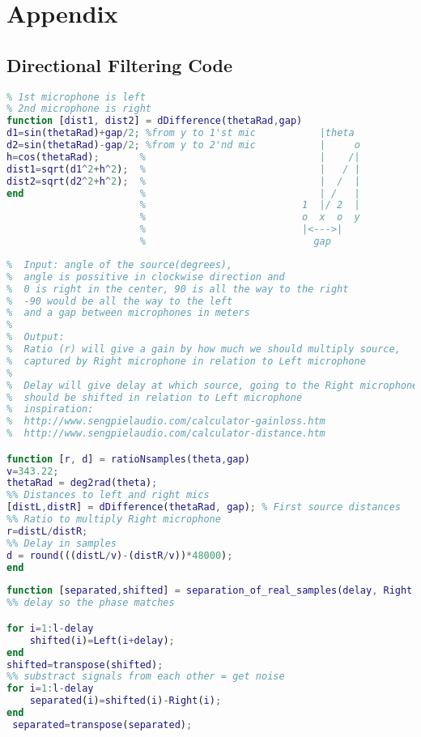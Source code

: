 \chapter{Appendix}
\label{ch:appAlabel}
\section{Directional Filtering Code}
\begin{lstlisting}[language=Matlab, label=lst:delayDifference]
% Gives distance for the signal to travel to each microphones 
% 1st microphone is left 
% 2nd microphone is right
function [dist1, dist2] = dDifference(thetaRad,gap)
d1=sin(thetaRad)+gap/2; %from y to 1'st mic           |theta
d2=sin(thetaRad)-gap/2; %from y to 2'nd mic           |     o
h=cos(thetaRad);       %                              |    /|
dist1=sqrt(d1^2+h^2);  %                              |   / |
dist2=sqrt(d2^2+h^2);  %                              |  /  |
end                    %                              | /   |
                       %                           1  |/ 2  |
                       %                           o  x  o  y
                       %                           |<--->|
                       %                             gap
\end{lstlisting}

\begin{lstlisting}[language=Matlab, label=lst:ratioNsamples]
%% Function gives ratio and delay, which can be used to realisticaly delay and add realistic gain to the signals
%  Input: angle of the source(degrees), 
%  angle is possitive in clockwise direction and 
%  0 is right in the center, 90 is all the way to the right
%  -90 would be all the way to the left
%  and a gap between microphones in meters
%
%  Output:
%  Ratio (r) will give a gain by how much we should multiply source,
%  captured by Right microphone in relation to Left microphone
%  
%  Delay will give delay at which source, going to the Right microphone
%  should be shifted in relation to Left microphone
%  inspiration: 
%  http://www.sengpielaudio.com/calculator-gainloss.htm
%  http://www.sengpielaudio.com/calculator-distance.htm

function [r, d] = ratioNsamples(theta,gap)
v=343.22;
thetaRad = deg2rad(theta);
%% Distances to left and right mics
[distL,distR] = dDifference(thetaRad, gap); % First source distances
%% Ratio to multiply Right microphone
r=distL/distR;
%% Delay in samples
d = round(((distL/v)-(distR/v))*48000);
end
\end{lstlisting}
\begin{lstlisting}[language=Matlab, label=1st:realSamplesSeparationFunction]
function [separated,shifted] = separation_of_real_samples(delay, Right, Left,l)
%% delay so the phase matches

for i=1:l-delay
    shifted(i)=Left(i+delay);
end
shifted=transpose(shifted);
%% substract signals from each other = get noise
for i=1:l-delay
    separated(i)=shifted(i)-Right(i);
end
 separated=transpose(separated);
\end{lstlisting}

